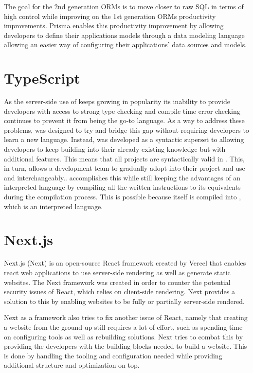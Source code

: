 The goal for the 2nd generation ORMs is to move closer to raw SQL in terms of high control while improving on the 1st generation ORMs productivity improvements.
Prisma enables this productivity improvement by allowing developers to define their applications models through a data modeling language allowing an easier way of configuring their applications' data sources and models\cite{Prisma_Doc}.

\section*{TypeScript}
As the server-side use of \javascript{} keeps growing in popularity its inability to provide developers with access to strong type checking and compile time error checking continues to prevent it from being the go-to language.
As a way to address these problems, \typescript{} was designed to try and bridge this gap without requiring developers to learn a new language.
Instead, \typescript{} was developed as a syntactic superset to \javascript{} allowing developers to keep building into their already existing knowledge but with additional features.
This means that all \javascript{} projects are syntactically valid in \typescript{}. This, in turn, allows a development team to gradually adopt \typescript{} into their project and use \typescript{} and \javascript{} interchangeably.\cite{TypeScript}.
\typescript{} accomplishes this while still keeping the advantages of an interpreted language by compiling all the written instructions to its \javascript{} equivalents during the compilation process.
This is possible because \typescript{} itself is compiled into \javascript{}, which is an interpreted language.

\section*{Next.js}
Next.js (Next) is an open-source React framework created by Vercel that enables react web applications to use server-side rendering as well as generate static websites. The Next framework was created in order to counter the potential security issues of React, which relies on client-side rendering. Next provides a solution to this by enabling websites to be fully or partially server-side rendered\cite {Nextjs_Docks}.

Next as a framework also tries to fix another issue of React, namely that creating a website from the ground up still requires a lot of effort, such as spending time on configuring tools as well as rebuilding solutions.
Next tries to combat this by providing the developers with the building blocks needed to build a website.
This is done by handling the tooling and configuration needed while providing additional structure and optimization on top\cite{Nextjs_Docks}.


